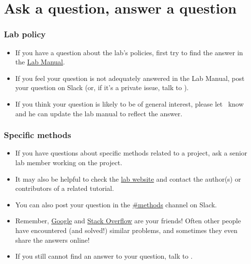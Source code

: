 \documentclass{tufte-book} %
\begin{document}
\chapter{Ask a question, answer a question}\label{ch:faq}

\subsection{Lab policy}
\begin{itemize}
\item If you have a question about the lab's policies, first try to find the answer in the \href{https://github.com/brain-networks/lab-manual/tree/master/lab_manual.pdf}{Lab Manual}.

\item If you feel your question is not adequately answered in the Lab Manual, post your question on Slack (or, if it's a private issue, talk to \director).

\item If you think your question is likely to be of general interest, please let \director~know and he can update the lab manual to reflect the answer.
\end{itemize}

\subsection{Specific methods}
\begin{itemize}
\item If you have questions about specific methods related to a project, ask a senior lab member working on the project.

\item It may also be helpful to check the \href{https://www.brainnetworkslab.com}{lab website} and contact the author(s) or contributors of a related tutorial.

\item You can also post your question in the \href{https://bnbl.slack.com/messages/methods/}{\#methods} channel on Slack.

\item Remember, \href{https://www.google.com/}{Google} and \href{https://stackoverflow.com/}{Stack Overflow} are your friends! Often other people have encountered (and solved!) similar problems, and sometimes they even share the answers online!

\item If you still cannot find an answer to your question, talk to \director.
\end{itemize}
\end{document}
